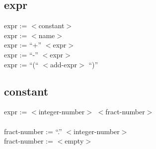 \documentclass{article}
\begin{document}
  \subsection{expr}
  expr := $<$constant$>$
  \\
  expr := $<$name$>$
  \\
  expr := ``+'' $<$expr$>$
  \\
  expr := ``-'' $<$expr$>$
  \\
  expr := ``(`` $<$add-expr$>$ ``)''
 
  \subsection{constant}
  expr := $<$integer-number$>$ $<$fract-number$>$
  \\
  \\
  fract-number := ``.'' $<$integer-number$>$
  \\
  fract-number := $<$empty$>$
\end{document}
